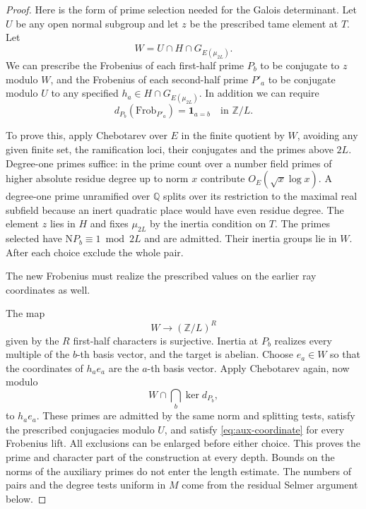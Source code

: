 \begin{proof}
Here is the form of prime selection needed for the Galois
determinant. Let \(U\) be any open normal subgroup and let \(z\)
be the prescribed tame element at \(T\). Let
\[
       W=U\cap H\cap G_{E(\mu_{2L})}.
\]
We can prescribe the Frobenius of each first-half prime \(P_b\)
to be conjugate to \(z\) modulo \(W\), and the Frobenius of
each second-half prime \(P'_a\) to be conjugate modulo \(U\)
to any specified \(h_a\in H\cap G_{E(\mu_{2L})}\). In addition
we can require
\begin{equation}\label{eq:aux-coordinate}
       d_{P_b}(\mathrm{Frob}_{P'_a})=\mathbf1_{a=b}
                         \quad\text{in }\mathbb Z/L .
\end{equation}

To prove this, apply Chebotarev over \(E\) in the finite
quotient by \(W\), avoiding any given finite set, the ramification
loci, their conjugates and the primes above \(2L\). Degree-one
primes suffice: in the prime count over a number field primes of
higher absolute residue degree up to norm \(x\) contribute
\(O_E(\sqrt{x}\log x)\). A degree-one prime unramified over
\(\mathbb Q\) splits over its restriction to the maximal real
subfield because an inert quadratic place would have even residue
degree. The element \(z\) lies in \(H\) and fixes \(\mu_{2L}\)
by the inertia condition on \(T\). The primes selected have
\(\mathrm NP_b\equiv1\bmod 2L\) and are admitted. Their
inertia groups lie in \(W\). After each choice exclude the
whole pair.

The new Frobenius must realize the prescribed values on the earlier ray coordinates as well.

The map
\[
 W\to(\mathbb Z/L)^R
\]
given by the \(R\) first-half
characters is surjective. Inertia at \(P_b\) realizes every
multiple of the \(b\)-th basis vector, and the target is abelian.
Choose \(e_a\in W\) so that the coordinates of \(h_a e_a\)
are the \(a\)-th basis vector. Apply Chebotarev again, now
modulo
\[
 W\cap\bigcap_b\ker d_{P_b},
\]
to \(h_a e_a\).
These primes are admitted by the same norm and splitting tests,
satisfy the prescribed conjugacies modulo \(U\), and satisfy
\eqref{eq:aux-coordinate} for every Frobenius lift. All exclusions
can be enlarged before either choice. This proves the prime and
character part of the construction at every depth. Bounds on
the norms of the auxiliary primes do not enter the length
estimate. The numbers of pairs and the degree tests uniform in
\(M\) come from the residual Selmer argument below.
\end{proof}

